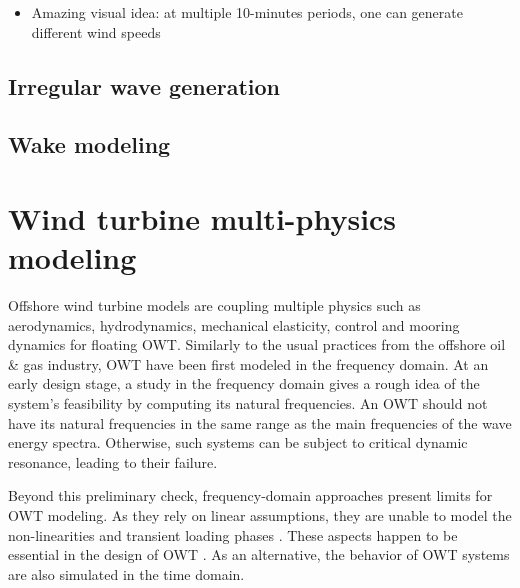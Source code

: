\begin{itemize}
    \item Amazing visual idea: at multiple 10-minutes periods, one can generate different wind speeds  
\end{itemize}


\subsection{Irregular wave generation}


\subsection{Wake modeling}





\section{Wind turbine multi-physics modeling} \label{sec:owt_modeling}

Offshore wind turbine models are coupling multiple physics such as aerodynamics, hydrodynamics, mechanical elasticity, control and mooring dynamics for floating OWT. 
Similarly to the usual practices from the offshore oil \& gas industry, OWT have been first modeled in the frequency domain. 
At an early design stage, a study in the frequency domain gives a rough idea of the system's feasibility by computing its natural frequencies.
An OWT should not have its natural frequencies in the same range as the main frequencies of the wave energy spectra. 
Otherwise, such systems can be subject to critical dynamic resonance, leading to their failure.

Beyond this preliminary check, frequency-domain approaches present limits for OWT modeling. 
As they rely on linear assumptions, they are unable to model the non-linearities and transient loading phases \citep{matha_2011_ISOPE}. 
These aspects happen to be essential in the design of OWT \citep{jonkman_2011_ISOPE}.
As an alternative, the behavior of OWT systems are also simulated in the time domain. 

